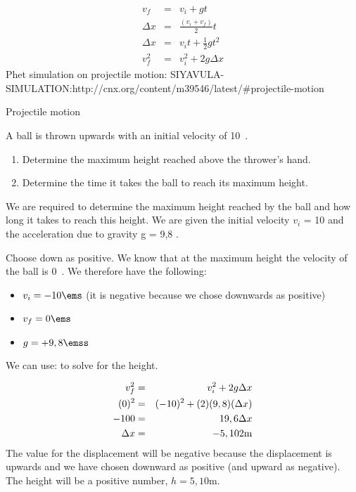\begin{eqnarray}
v_f &=& v_i + gt \label{eq:pg:eq1}\\
\Delta x &=& \frac{(v_i + v_f)}{2} t\label{eq:pg:eq2}\\
\Delta x &=& v_it + \frac{1}{2}gt^2 \label{eq:pg:eq3}\\
v_f^2 &=& v_i^2 + 2g\Delta x \label{eq:pg:eq4}
\end{eqnarray}
Phet simulation on projectile motion: SIYAVULA-SIMULATION:http://cnx.org/content/m39546/latest/#projectile-motion
\begin{wex}{Projectile motion}{A ball is thrown upwards with an initial velocity of 10~\ms. \begin{enumerate}
	\item Determine the maximum height reached above the thrower's hand.
	\item Determine the time it takes the ball to reach its maximum height.
	\end{enumerate}}
\newpage
{
We are required to determine the maximum height reached by the ball and how long it takes to reach this height. We are given the initial velocity $v_i$ = 10 \ms and the acceleration due to gravity g = 9,8 \mss.

Choose down as positive. We know that at the maximum height the velocity of the ball is 0~\ms. We therefore have the following:
\begin{itemize}
\item{$v_i=-10\ems$ (it is negative because we chose downwards as positive)}
\item{$v_f=0\ems$}
\item{$g=+9,8\emss$}
\end{itemize}

We can use:
to solve for the height.

\begin{eqnarray*}
v_f^2 &=& v_i^2 + 2g\Delta x\\
(0)^{2} &=& (-10)^{2} + (2)(9,8)  (\Delta x)\\
-100 &=& 19,6 \Delta x\\
\Delta x &=& -5,102 \rm{m}
\end{eqnarray*}
The value for the displacement will be negative because the displacement is upwards and we have chosen downward as positive (and upward as negative). The height will be a positive number, $h=5,10$m.

}
\end{wex}

